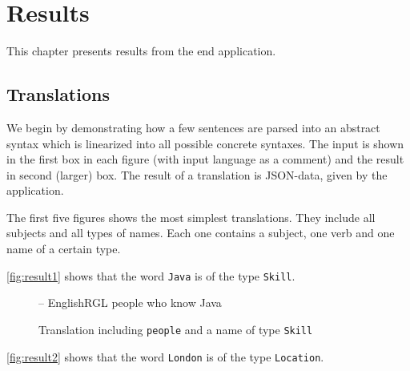 \chapter{Results}\label{ch:results}
This chapter presents results from the end application.

\section{Translations}
We begin by demonstrating how a few sentences are parsed into an abstract syntax which is linearized into all possible concrete syntaxes. The input is shown in the first box in each figure (with input language as a comment) and the result in second (larger) box. The result of a translation is JSON-data, given by the application.

The first five figures shows the most simplest translations. They include all subjects and all types of names. Each one contains a subject, one verb and one name of a certain type.
\newline
\newline

\autoref{fig:result1} shows that the word \texttt{Java} is of the type \texttt{Skill}.

\begin{figure}[H]
\begin{terminal}
-- EnglishRGL
people who know Java
\end{terminal}
\begin{json-small}
\end{json-small}
\caption{Translation including \texttt{people} and a name of type \texttt{Skill}\label{fig:result1}}
\end{figure}

\autoref{fig:result2} shows that the word \texttt{London} is of the type \texttt{Location}.

